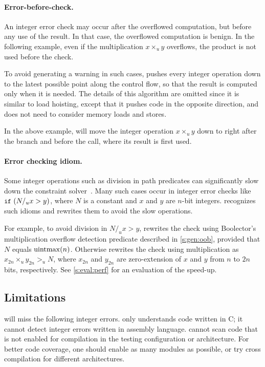 \paragraph{Error-before-check.}
An integer error check may occur after the overflowed computation,
but before any use of the result.  In that case, the overflowed
computation is benign.  In the following example, even if the
multiplication $x \times_u y$ overflows, the product  is
not used before the check.


To avoid generating a warning in such cases, \sys pushes every
integer operation down to the latest possible point along the control
flow, so that the result is computed only when it is needed.  The
details of this algorithm are omitted since it is similar to load
hoisting, except that it pushes code in the opposite direction, and
does not need to consider memory loads and stores.

In the above example, \sys will move the integer operation $x
\times_u y$ down to right after the  branch and before the
 call, where its result  is first used.

\paragraph{Error checking idiom.}

Some integer operations such as division in path predicates can
significantly slow down the constraint solver~\cite{brummayer:perf}.
Many such cases occur in integer error checks like $\cc{if}\ (N /_u
x > y)$, where $N$ is a constant and $x$ and $y$ are $n$-bit integers.
\sys recognizes such idioms and rewrites them to avoid the slow
operations.

For example, to avoid division in $N /_u x > y$, \sys rewrites the check using
Boolector's multiplication overflow detection predicate described
in \autoref{s:gen:oob}, provided that $N$ equals $\operatorname{uintmax}(n)$.
Otherwise \sys rewrites the check using multiplication as $x_{2n}
\times_u y_{2n} >_u N$, where $x_{2n}$ and $y_{2n}$ are zero-extension
of $x$ and $y$ from $n$ to $2n$ bits, respectively.
%
See \autoref{s:eval:perf} for an evaluation of the speed-up.

\subsection{Limitations}
\label{s:gen:limit}

\sys will miss the following integer errors.
%
\sys only understands code written in C; it cannot detect integer
errors written in assembly language.
%
\sys cannot scan code that is not enabled for compilation in the
testing configuration or architecture.  For better code coverage,
one should enable as many modules as possible, or try cross compilation
for different architectures.

